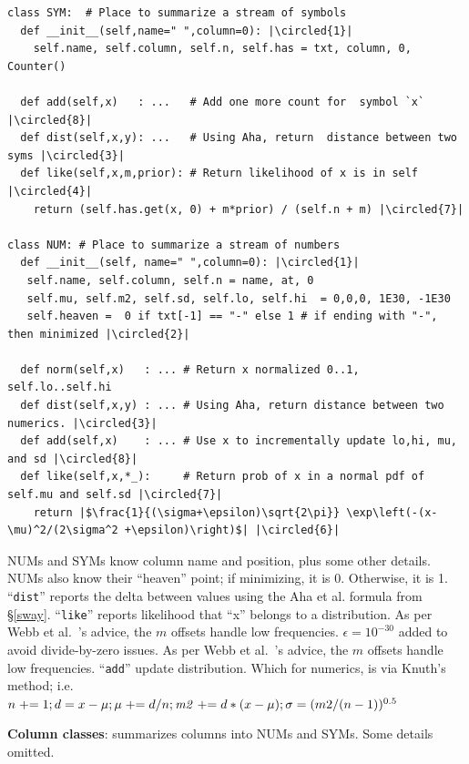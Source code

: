  
\begin{listing} 
\begin{verbatim}
class SYM:  # Place to summarize a stream of symbols
  def __init__(self,name=" ",column=0): |\circled{1}|
    self.name, self.column, self.n, self.has = txt, column, 0, Counter() 

  def add(self,x)   : ...   # Add one more count for  symbol `x` |\circled{8}|
  def dist(self,x,y): ...   # Using Aha, return  distance between two syms |\circled{3}|
  def like(self,x,m,prior): # Return likelihood of x is in self  |\circled{4}|
    return (self.has.get(x, 0) + m*prior) / (self.n + m) |\circled{7}|

class NUM: # Place to summarize a stream of numbers
  def __init__(self, name=" ",column=0): |\circled{1}|
   self.name, self.column, self.n = name, at, 0
   self.mu, self.m2, self.sd, self.lo, self.hi  = 0,0,0, 1E30, -1E30
   self.heaven =  0 if txt[-1] == "-" else 1 # if ending with "-", then minimized |\circled{2}| 

  def norm(self,x)   : ... # Return x normalized 0..1, self.lo..self.hi
  def dist(self,x,y) : ... # Using Aha, return distance between two numerics. |\circled{3}|
  def add(self,x)    : ... # Use x to incrementally update lo,hi, mu, and sd |\circled{8}|
  def like(self,x,*_):     # Return prob of x in a normal pdf of self.mu and self.sd |\circled{7}|
    return |$\frac{1}{(\sigma+\epsilon)\sqrt{2\pi}} \exp\left(-(x-\mu)^2/(2\sigma^2 +\epsilon)\right)$| |\circled{6}|
\end{verbatim}

{\scriptsize 
{}  NUMs and SYMs   know   column name and  position, plus some other details.\newline 
{} NUMs  also know their ``heaven'' point; if minimizing, it is 0. Otherwise, it is 1.  \newline
{} ``\texttt{dist}'' reports the delta between  values using the
Aha et al. formula  from \S\ref{sway}.\newline
{} ``\texttt{like}'' reports  likelihood that ``x'' belongs to a distribution. \newline
{}  As per Webb et al.~\cite{yang2002comparative}'s advice,  the $m$ offsets handle low frequencies.   \newline
{}  $\epsilon=10^{-30}$ added to avoid divide-by-zero issues.\newline 
{} As per Webb et al.~\cite{yang2002comparative}'s advice,  the $m$ offsets handle low frequencies.   \newline
{} ``\texttt{add}''   update   distribution. Which for numerics, is via Knuth's method; i.e.\newline
\textcolor{white}{.}\hspace{3mm}$n{\pluseq}1; d=x-\mu; \mu{\pluseq}d/n; \mathit{m2}{\pluseq}d*(x-\mu); \sigma=(m2/(n-1))^{0.5}$} 


\caption{{\bf Column classes}: summarizes  columns into NUMs and SYMs. Some details omitted.} 
\label{listing:numsum}
\end{listing} 
 

